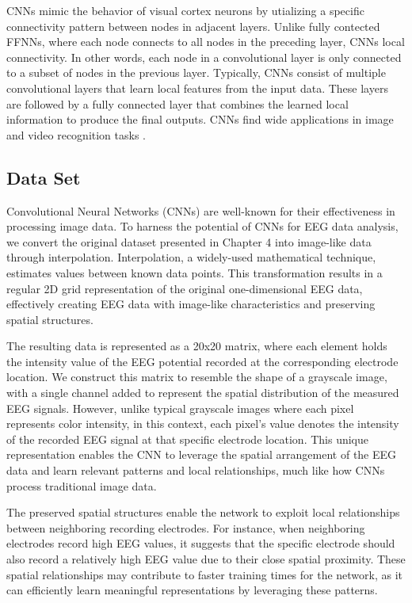 \documentclass[a4paper, UKenglish, 11pt]{uiomaster}
\begin{document}
CNNs mimic the behavior of visual cortex neurons by utializing a specific connectivity pattern between nodes in adjacent layers. Unlike fully contected FFNNs, where each node connects to all nodes in the preceding layer, CNNs  local connectivity. In other words, each node in a convolutional layer is only connected to a subset of nodes in the previous layer. Typically, CNNs consist of multiple convolutional layers that learn local features from the input data. These layers are followed by a fully connected layer that combines the learned local information to produce the final outputs. CNNs find wide applications in image and video recognition tasks \cite{Hjorth-Jensen2022}.



\subsection{Data Set}

Convolutional Neural Networks (CNNs) are well-known for their effectiveness in processing image data. To harness the potential of CNNs for EEG data analysis, we convert the original dataset presented in Chapter 4 into image-like data through interpolation. Interpolation, a widely-used mathematical technique, estimates values between known data points. This transformation results in a regular 2D grid representation of the original one-dimensional EEG data, effectively creating EEG data with image-like characteristics and preserving spatial structures.

The resulting data is represented as a 20x20 matrix, where each element holds the intensity value of the EEG potential recorded at the corresponding electrode location. We construct this matrix to resemble the shape of a grayscale image, with a single channel added to represent the spatial distribution of the measured EEG signals. However, unlike typical grayscale images where each pixel represents color intensity, in this context, each pixel's value denotes the intensity of the recorded EEG signal at that specific electrode location. This unique representation enables the CNN to leverage the spatial arrangement of the EEG data and learn relevant patterns and local relationships, much like how CNNs process traditional image data.

The preserved spatial structures enable the network to exploit local relationships between neighboring recording electrodes. For instance, when neighboring electrodes record high EEG values, it suggests that the specific electrode should also record a relatively high EEG value due to their close spatial proximity. These spatial relationships may contribute to faster training times for the network, as it can efficiently learn meaningful representations by leveraging these patterns.
\end{document}
